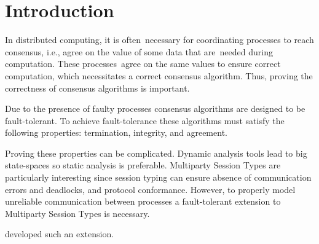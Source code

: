 \chapter{Introduction}

In distributed computing, it is often necessary for coordinating processes to reach consensus, i.e., agree on the value of some data that are needed during computation.
These processes agree on the same values to ensure correct computation, which necessitates a correct consensus algorithm.
Thus, proving the correctness of consensus algorithms is important.

Due to the presence of faulty processes consensus algorithms are designed to be fault-tolerant.
To achieve fault-tolerance these algorithms must satisfy the following properties: termination, integrity, and agreement\cite{dist_sys}.

Proving these properties can be complicated.
Dynamic analysis tools lead to big state-spaces so static analysis is preferable.
Multiparty Session Types are particularly interesting since session typing can ensure absence of communication errors and deadlocks, and protocol conformance\cite{mpstbd}.
However, to properly model unreliable communication between processes a fault-tolerant extension to Multiparty Session Types is necessary.

\citeauthor{ftmpst} developed such an extension.
